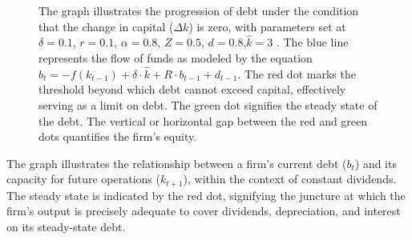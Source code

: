 \documentclass[12pt]{article}
\begin{document}
\begin{figure}
    \centering
    \caption{The graph illustrates the progression of debt under the condition that the change in capital (\(\Delta k\))
    is zero, with parameters set at \(\delta = 0.1\), \(r = 0.1\), \(\alpha = 0.8\), \(Z = 0.5\), \(d = 0.8\),\(\widehat{k} = 3\) . The
    blue line represents the flow of funds as modeled by the equation \(b_{t} =  - f(k_{t-1}) + \delta \cdot \widehat{k} + R
    \cdot b_{t-1} + d_{t-1}\). The red dot marks the threshold beyond which debt cannot exceed capital, effectively serving
    as a limit 
    on debt. The green dot signifies the steady state of the debt. The vertical or horizontal gap between the red and
    green dots quantifies the firm's equity. 
    }
\end{figure}
The graph illustrates the relationship between a firm's current debt (\(b_t\)) and its capacity for future operations
(\(k_{t+1}\)), within the context of constant dividends. The steady state is indicated by the red dot, signifying the
juncture at which the firm's output is precisely adequate to cover dividends, depreciation, and interest on its
steady-state debt. 
\end{document}
